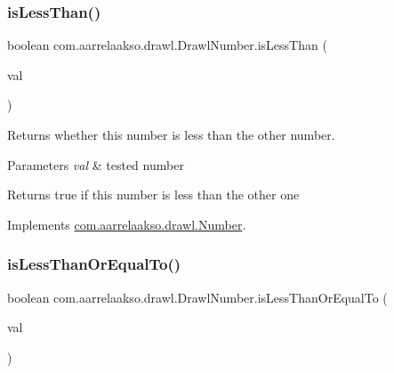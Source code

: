 \subsubsection{\texorpdfstring{is\+Less\+Than()}{isLessThan()}\hspace{0.1cm}{\footnotesize\ttfamily [2/2]}}
{\footnotesize\ttfamily boolean com.\+aarrelaakso.\+drawl.\+Drawl\+Number.\+is\+Less\+Than (\begin{DoxyParamCaption}\item[{final double}]{val }\end{DoxyParamCaption})}



Returns whether this number is less than the other number. 


\begin{DoxyParams}{Parameters}
{\em val} & tested number \\
\hline
\end{DoxyParams}
\begin{DoxyReturn}{Returns}
true if this number is less than the other one 
\end{DoxyReturn}


Implements \hyperlink{interfacecom_1_1aarrelaakso_1_1drawl_1_1_number_a82b299428c48204fb05229dbea2b439b}{com.\+aarrelaakso.\+drawl.\+Number}.

\mbox{\label{classcom_1_1aarrelaakso_1_1drawl_1_1_drawl_number_af3936483f84eec933c41b7dc78bb473a}} 
\subsubsection{\texorpdfstring{is\+Less\+Than\+Or\+Equal\+To()}{isLessThanOrEqualTo()}\hspace{0.1cm}{\footnotesize\ttfamily [1/2]}}
{\footnotesize\ttfamily boolean com.\+aarrelaakso.\+drawl.\+Drawl\+Number.\+is\+Less\+Than\+Or\+Equal\+To (\begin{DoxyParamCaption}\item[{@Not\+Null final \hyperlink{interfacecom_1_1aarrelaakso_1_1drawl_1_1_number}{Number}}]{val }\end{DoxyParamCaption})}



